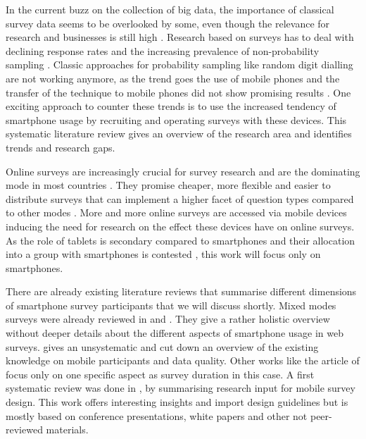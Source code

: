 In the current buzz on the collection of big data, the importance of classical survey data seems to be overlooked by some, even though the relevance for research and businesses is still high \cite{couper_is_2013, miller_is_2017}. Research based on surveys has to deal with declining response rates \cite{miller_is_2017} and the increasing prevalence of non-probability sampling \cite{couper_is_2013}. Classic approaches for probability sampling like random digit dialling are not working anymore, as the trend goes the use of mobile phones and the transfer of the technique to mobile phones did not show promising results \cite{bucher_exploring_2021}. One exciting approach to counter these trends is to use the increased tendency of smartphone usage \cite{weigold_computerized_2021} by recruiting and operating surveys with these devices. This systematic literature review gives an overview of the research area and identifies trends and research gaps. 

Online surveys are increasingly crucial for survey research and are the dominating mode in most countries \cite{fielding_sage_2017}. They promise cheaper, more flexible and easier to distribute surveys that can implement a higher facet of question types compared to other modes \cite{gummer_does_2019}. More and more online surveys are accessed via mobile devices \cite{de_bruijne_mobile_2014} inducing the need for research on the effect these devices have on online surveys. As the role of tablets is secondary compared to smartphones and their allocation into a group with smartphones is contested \cite{couper_why_2017}, this work will focus only on smartphones. 

There are already existing literature reviews that summarise different dimensions of smartphone survey participants that we will discuss shortly. Mixed modes surveys were already reviewed in \cite{callegaro_mixed-mode_2013} and \cite{deleeuw_mixed-mode_2018}. They give a rather holistic overview without deeper details about the different aspects of smartphone usage in web surveys. \cite{wells_what_2015} gives an unsystematic and cut down an overview of the existing knowledge on mobile participants and data quality. Other works like the article of \cite{couper_why_2017} focus only on one specific aspect as survey duration in this case. A first systematic review was done in \cite{antoun_design_2018}, by summarising research input for mobile survey design. This work offers interesting insights and import design guidelines but is mostly based on conference presentations, white papers and other not peer-reviewed materials. 

